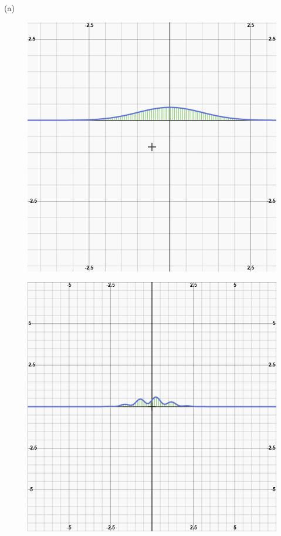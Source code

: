 \documentclass{report}
\begin{document}
\section{}
(a) \begin{figure}
	\centering
	\includegraphics[width=0.7\linewidth]{normal_distribution}
	\caption{}
	\label{fig:normal_distribution}
\end{figure}
\begin{figure}
	\centering
	\includegraphics[width=0.7\linewidth]{second_function}
	\caption{}
	\label{fig:second_function}
\end{figure}
{\newline}
\end{document}
